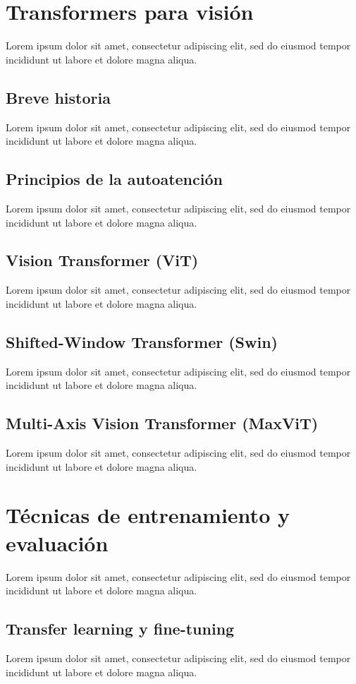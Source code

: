 \documentclass[a4paper,10pt]{book}
\begin{document}
\section{Transformers para visión}
Lorem ipsum dolor sit amet, consectetur adipiscing elit, sed do eiusmod tempor incididunt ut labore et dolore magna aliqua.
\subsection{Breve historia}
Lorem ipsum dolor sit amet, consectetur adipiscing elit, sed do eiusmod tempor incididunt ut labore et dolore magna aliqua.
\subsection{Principios de la autoatención}
Lorem ipsum dolor sit amet, consectetur adipiscing elit, sed do eiusmod tempor incididunt ut labore et dolore magna aliqua.
\subsection{Vision Transformer (ViT)}
Lorem ipsum dolor sit amet, consectetur adipiscing elit, sed do eiusmod tempor incididunt ut labore et dolore magna aliqua.
\subsection{Shifted-Window Transformer (Swin)}
Lorem ipsum dolor sit amet, consectetur adipiscing elit, sed do eiusmod tempor incididunt ut labore et dolore magna aliqua.
\subsection{Multi-Axis Vision Transformer (MaxViT)}
Lorem ipsum dolor sit amet, consectetur adipiscing elit, sed do eiusmod tempor incididunt ut labore et dolore magna aliqua.
\section{Técnicas de entrenamiento y evaluación}
Lorem ipsum dolor sit amet, consectetur adipiscing elit, sed do eiusmod tempor incididunt ut labore et dolore magna aliqua.
\subsection{Transfer learning y fine-tuning}
Lorem ipsum dolor sit amet, consectetur adipiscing elit, sed do eiusmod tempor incididunt ut labore et dolore magna aliqua.
\end{document}
